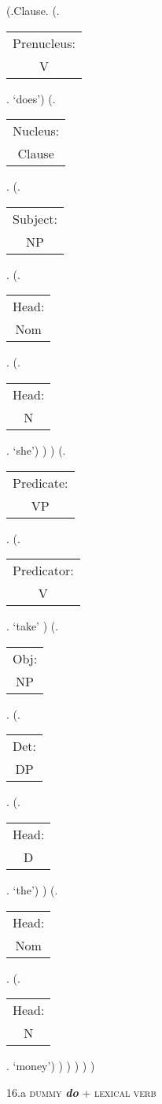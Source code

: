 \documentclass[12pt,letterpaper]{article}
\begin{document}
\begin{figure}
	\begin{center}
		\begin{parsetree}
			(.Clause.
			(.\begin{tabular}{c}Prenucleus:\\V\end{tabular}. `does')
			(.\begin{tabular}{c}Nucleus:\\Clause\end{tabular}.    
			(.\begin{tabular}{c}Subject:\\NP\end{tabular}.  
			(.\begin{tabular}{c}Head:\\Nom\end{tabular}.
			(.\begin{tabular}{c}Head:\\N\end{tabular}. `she')
			)
			)
			(.\begin{tabular}{c}Predicate:\\VP\end{tabular}.
			(.\begin{tabular}{c}Predicator:\\V\end{tabular}. `take' )
			(.\begin{tabular}{c}Obj:\\NP\end{tabular}.  
			(.\begin{tabular}{c}Det:\\DP\end{tabular}.  
			(.\begin{tabular}{c}Head:\\D\end{tabular}. `the')
			)
			(.\begin{tabular}{c}Head:\\Nom\end{tabular}.
			(.\begin{tabular}{c}Head:\\N\end{tabular}. `money')
			)
			)
			)
			)
			) 
			
		\end{parsetree}
		\hfill \break \hfill \break
		16.a \textsc{dummy} \textit{\textbf{do}} + \textsc{lexical verb}
	\end{center}
\end{figure}
\end{document}
